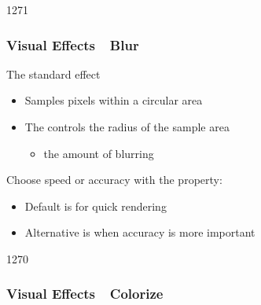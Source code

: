 \begin{slide}{1271}\frametitle{Visual Effects~\textendash~Blur}

The standard  effect

\begin{itemize}
\item Samples pixels within a circular area
\item The  controls the radius of the sample area
  \begin{itemize}
  \item the amount of blurring
  \end{itemize}
\end{itemize}

\vspace*{0.5em}

\vspace*{1em}
Choose speed or accuracy with the  property:

\begin{itemize}
\item Default is  for quick rendering
\item Alternative is  when accuracy is more important
\end{itemize}

\end{slide}


\begin{slide}{1270}\frametitle{Visual Effects~\textendash~Colorize}




\end{slide}



